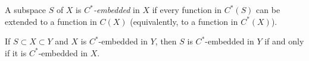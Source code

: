 A subspace $S$ of $X$ is \emph{$C^*$-embedded} in $X$ if every function in $C^*(S)$ can be extended to a function in $C(X)$ (equivalently, to a function in $C^*(X)$).

If $S \subset X \subset Y$ and $X$ is $C^*$-embedded in $Y$, then $S$ is $C^*$-embedded in $Y$ if and only if it is $C^*$-embedded in $X$.

